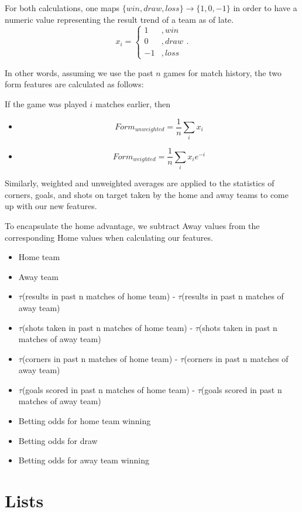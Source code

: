 \documentclass[paper=a4, fontsize=11pt]{scrartcl}
\numberwithin{equation}{section}		%
\numberwithin{figure}{section}			%
\numberwithin{table}{section}				%
\begin{document}
For both calculations, one maps $\{win, draw, loss\} \to \{1, 0, -1\}$ in order to have a numeric value representing the result trend of a team as of late. $$x_i = \begin{cases} 1&, win \\ 0&, draw \\ -1&, loss \end{cases}.$$

In other words, assuming we use the past $n$ games for match history, the two form features are calculated as follows:

If the game was played $i$ matches earlier, then
\begin{itemize}
\item $$Form_{unweighted} = \frac{1}{n} \sum_i x_i$$
\item $$Form_{weighted} = \frac{1}{n} \sum_i x_i e^{-i}$$
\end{itemize}

Similarly, weighted and unweighted averages are applied to the statistics of corners, goals, and shots on target taken by the home and away teams to come up with our new features.

To encapsulate the home advantage, we subtract Away values from the corresponding Home values when calculating our features.

\begin{itemize}
\item Home team
\item Away team
\item $\tau$(results in past n matches of home team) - $\tau$(results in past n matches of away team)
\item $\tau$(shots taken in past n matches of home team) - $\tau$(shots taken in past n matches of away team)
\item $\tau$(corners in past n matches of home team) - $\tau$(corners in past n matches of away team)
\item $\tau$(goals scored in past n matches of home team) - $\tau$(goals scored in past n matches of away team)
\item Betting odds for home team winning
\item Betting odds for draw
\item Betting odds for away team winning
\end{itemize}

\section{Lists}
\end{document}
